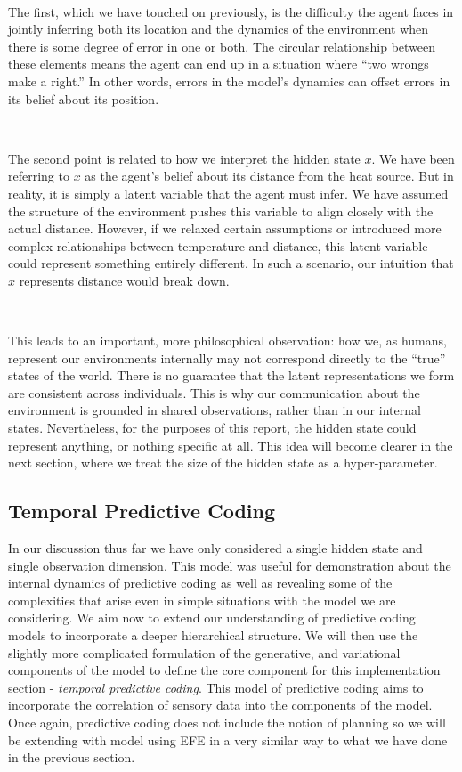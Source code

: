 \documentclass{article}
\begin{document}
\

The first, which we have touched on previously, is the difficulty the agent faces in jointly inferring both its location and the dynamics of the environment when there is some degree of error in one or both. The circular relationship between these elements means the agent can end up in a situation where ``two wrongs make a right.'' In other words, errors in the model's dynamics can offset errors in its belief about its position.

\

The second point is related to how we interpret the hidden state $x$. We have been referring to $x$ as the agent's belief about its distance from the heat source. But in reality, it is simply a latent variable that the agent must infer. We have assumed the structure of the environment pushes this variable to align closely with the actual distance. However, if we relaxed certain assumptions or introduced more complex relationships between temperature and distance, this latent variable could represent something entirely different. In such a scenario, our intuition that $x$ represents distance would break down.

\

This leads to an important, more philosophical observation: how we, as humans, represent our environments internally may not correspond directly to the ``true'' states of the world. There is no guarantee that the latent representations we form are consistent across individuals. This is why our communication about the environment is grounded in shared observations, rather than in our internal states. Nevertheless, for the purposes of this report, the hidden state could represent anything, or nothing specific at all. This idea will become clearer in the next section, where we treat the size of the hidden state as a hyper-parameter.


\subsection{Temporal Predictive Coding}

In our discussion thus far we have only considered a single hidden state and single observation dimension. This model was useful for demonstration about the internal dynamics of predictive coding as well as revealing some of the complexities that arise even in simple situations with the model we are considering. We aim now to extend our understanding of predictive coding models to incorporate a deeper hierarchical structure. \citep{friston2008hierarchical} We will then use the slightly more complicated formulation of the generative, and variational components of the model to define the core component for this implementation section - \textit{temporal predictive coding}. This model of predictive coding aims to incorporate the correlation of sensory data into the components of the model. Once again, predictive coding does not include the notion of planning so we will be extending with model using EFE in a very similar way to what we have done in the previous section.
\end{document}
